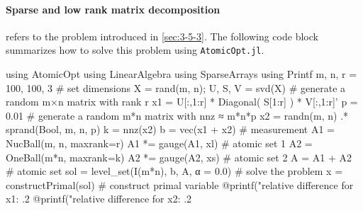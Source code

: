 \paragraph{Sparse and low rank matrix decomposition} refers to the problem introduced in \autoref{sec:3-5-3}. The following code block summarizes how to solve this problem using \texttt{AtomicOpt.jl}.
\begin{code}
  using AtomicOpt
  using LinearAlgebra
  using SparseArrays
  using Printf
  m, n, r = 100, 100, 3                  # set dimensions
  X = rand(m, n); U, S, V = svd(X)       # generate a random m×n matrix with rank r
  x1 = U[:,1:r] * Diagonal( S[1:r] ) * V[:,1:r]'
  p = 0.01                               # generate a random m*n matrix with nnz ≈ m*n*p
  x2 = randn(m, n) .* sprand(Bool, m, n, p)
  k = nnz(x2)
  b = vec(x1 + x2)                       # measurement
  A1 = NucBall(m, n, maxrank=r)
  A1 *= gauge(A1, xl)                    # atomic set 1
  A2 = OneBall(m*n, maxrank=k)
  A2 *= gauge(A2, xs)                    # atomic set 2
  A = A1 + A2                            # atomic set
  sol = level_set(I(m*n), b, A, α = 0.0) # solve the problem
  x = constructPrimal(sol)               # construct primal variable
  @printf("relative difference for x1: .2%
  @printf("relative difference for x2: .2%
\end{code}











